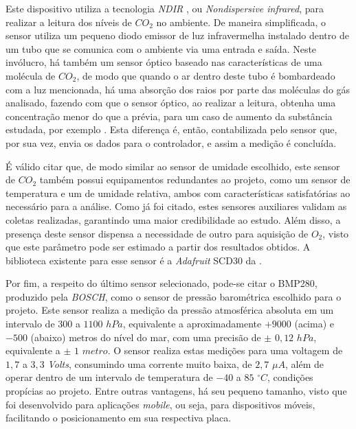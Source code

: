 \documentclass[acronym,symbols,table]{fei}
\begin{document}
Este dispositivo utiliza a tecnologia \textit{NDIR} , ou \textit{Nondispersive infrared}, para realizar a leitura dos níveis de ${CO}_{2}$ no ambiente. De maneira simplificada, o sensor utiliza um pequeno diodo emissor de luz infravermelha instalado dentro de um tubo que se comunica com o ambiente via uma entrada e saída.  Neste invólucro, há também um sensor óptico baseado nas características de uma molécula de ${CO}_{2}$,  de modo que quando o ar dentro deste tubo é bombardeado com a luz mencionada, há uma absorção dos raios por parte das moléculas do gás analisado, fazendo com que o sensor óptico, ao realizar a leitura, obtenha uma concentração menor do que a prévia, para um caso de aumento da substância estudada, por exemplo \cite{NDIR}. Esta diferença é, então, contabilizada pelo sensor que, por sua vez, envia os dados para o controlador, e assim a medição é concluída.

É válido citar que, de modo similar ao sensor de umidade escolhido, este sensor de ${CO}_{2}$ também possui equipamentos redundantes ao projeto, como um sensor de temperatura e um de umidade relativa, ambos com características satisfatórias ao necessário para a análise. Como já foi citado, estes sensores auxiliares validam as coletas realizadas, garantindo uma maior credibilidade ao estudo. Além disso, a presença deste sensor dispensa a necessidade de outro para aquisição de ${O}_{2}$, visto que este parâmetro pode ser estimado a partir dos resultados obtidos. A biblioteca existente para esse sensor é a \textit{Adafruit} SCD30 da \textcite{Adafruit_SCD30}. 

Por fim, a respeito do último sensor selecionado, pode-se citar o BMP280, produzido pela \textit{BOSCH}, como o sensor de pressão barométrica escolhido para o projeto. Este sensor realiza a medição da pressão atmosférica absoluta em um intervalo de $300$ a $1100$ $hPa$, equivalente a aproximadamente $+9000$ (acima) e $-500$ (abaixo) metros do nível do mar, com uma precisão de $\pm$ $0,12$ $hPa$, equivalente a $\pm$ $1$ $metro$. O sensor realiza estas medições para uma voltagem de $1,7$ a $3,3$ \textit{Volts}, consumindo uma corrente muito baixa, de $2,7$ $\mu$$A$, além de operar dentro de um intervalo de temperatura de $-40$ a $85$ $^{\circ}C$, condições propícias ao projeto. Entre outras vantagens, há seu pequeno tamanho, visto que foi desenvolvido para aplicações \textit{mobile}, ou seja, para dispositivos móveis, facilitando o posicionamento em sua respectiva placa.
\end{document}
